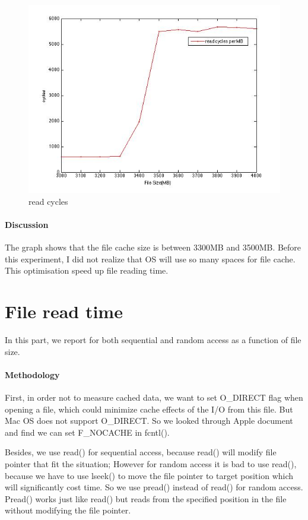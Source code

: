 \begin{figure}[htbp] %
   \centering
   \includegraphics[width=5in]{./pics/41.jpg} 
   \caption{read cycles}
   \label{fig:read cycles}
\end{figure}

\paragraph{Discussion}
The graph shows that the file cache size is between 3300MB and 3500MB. Before this experiment, I did not realize that OS will use so many spaces for file cache. This optimisation speed up file reading time.

\section{File read time}
In this part, we report for both sequential and random access as a function of file size.

\paragraph{Methodology}
First, in order not to measure cached data, we want to set O\_DIRECT flag when opening a file, which could minimize cache effects of the I/O from this file. But Mac OS does not support O\_DIRECT. So we looked through Apple document and find we can set F\_NOCACHE in fcntl().

Besides, we use read() for sequential access, because read() will modify file pointer that fit the situation; However for random access it is bad to use read(), because we have to use lseek() to move the file pointer to target position which will significantly cost time. So we use pread() instead of read() for random access. Pread() works just like read() but reads from the specified position in the file without modifying the file pointer.

